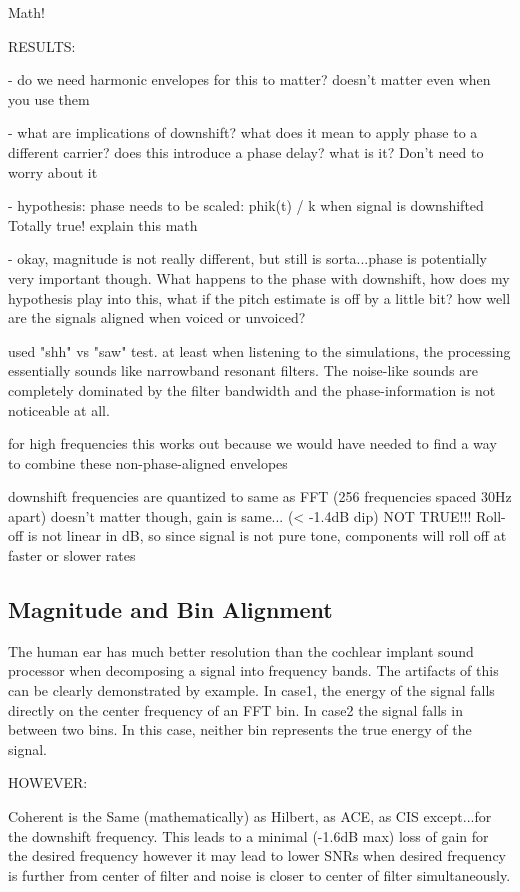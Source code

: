 \documentclass [11pt, proquest] {uwthesis}[2015/03/03]
\begin{document}
Math!

RESULTS:

 - do we need harmonic envelopes for this to matter?
 doesn't matter even when you use them

 - what are implications of downshift? what does it mean to apply phase to a different carrier? does this introduce a phase delay? what is it?
 Don't need to worry about it
 
 - hypothesis: phase needs to be scaled: phik(t) / k when signal is downshifted
 Totally true! explain this math
 
 - okay, magnitude is not really different, but still is sorta...phase is potentially very important though.  What happens to the phase with downshift, how does my hypothesis play into this, what if the pitch estimate is off by a little bit?  how well are the signals aligned when voiced or unvoiced?
 
used "shh" vs "saw" test.  at least when listening to the simulations, the processing essentially sounds like narrowband resonant filters.  The noise-like sounds are completely dominated by the filter bandwidth and the phase-information is not noticeable at all.

for high frequencies this works out because we would have needed to find a way to combine these non-phase-aligned envelopes

downshift frequencies are quantized to same as FFT (256 frequencies spaced 30Hz apart)
doesn't matter though, gain is same... (< -1.4dB dip)
NOT TRUE!!! Roll-off is not linear in dB, so since signal is not pure tone, components will roll off at faster or slower rates

\subsection{Magnitude and Bin Alignment}

The human ear has much better resolution than the cochlear implant sound processor when decomposing a signal into frequency bands.  The artifacts of this can be clearly demonstrated by example.  In case1, the energy of the signal falls directly on the center frequency of an FFT bin.  In case2 the signal falls in between two bins.  In this case, neither bin represents the true energy of the signal.

HOWEVER:

Coherent is the Same (mathematically) as Hilbert, as ACE, as CIS except...for the downshift frequency.  This leads to a minimal (-1.6dB max) loss of gain for the desired frequency however it may lead to lower SNRs when desired frequency is further from center of filter and noise is closer to center of filter simultaneously.
\end{document}
